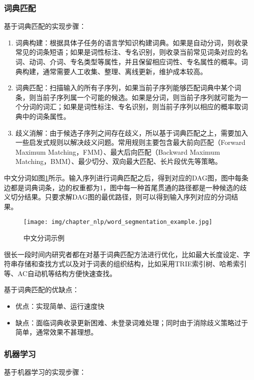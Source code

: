 \subsubsection{词典匹配}
\noindent
基于词典匹配的实现步骤：

\begin{enumerate}
\item 词典构建：根据具体子任务的语言学知识构建词典。如果是自动分词，则收录常见的词条短语；如果是词性标注、专名识别，则收录当前常见词条对应的名词、动词、介词、专名类型等属性，并且保留相应词性、专名属性的概率。词典构建，通常需要人工收集、整理、离线更新，维护成本较高。
\item 词典匹配：扫描输入的所有子序列，如果当前子序列能够匹配词典中某个词条，则当前子序列属一个可能的候选。如果是分词，则当前子序列就可能为一个分词的词汇；如果是词性标注、专名识别，则当前子序列以相应的概率取词典中的词条属性。
\item 歧义消解：由于候选子序列之间存在歧义，所以基于词典匹配之上，需要加入一些启发式规则以解决歧义问题。常用规则主要包含最大前向匹配（Forward Maximum Matching，FMM）、最大后向匹配（Backward Maximum Matching，BMM）、最少切分、双向最大匹配、长片段优先等策略\cite{wong1996chinese}\cite{weichun2013research}。
\end{enumerate}

中文分词如图\ref{fig:word_segmentation_example}所示。输入序列进行词典匹配之后，得到对应的DAG图，图中每条边都是词典词条，边的权重都为1，图中每一种首尾贯通的路径都是一种候选的歧义切分结果。只要求解DAG图的最优路径，则可以得到输入序列对应的分词结果。

\begin{figure}[h!]
\centering
\texttt{[image: img/chapter\_nlp/word\_segmentation\_example.jpg]}
\caption{中文分词示例}
\label{fig:word_segmentation_example}
\end{figure}

很长一段时间内研究者都在对基于词典匹配方法进行优化，比如最大长度设定、字符串存储和查找方式以及对于词表的组织结构，比如采用TRIE索引树\cite{yang2012enhanced}、哈希索引\cite{li2003new}等、AC自动机\cite{ngword}等结构方便快速查找。

基于词典匹配的优缺点：
\begin{itemize}
\item 优点：实现简单、运行速度快
\item 缺点：面临词典收录更新困难、未登录词难处理；同时由于消除歧义策略过于简单，通常效果不甚理想。
\end{itemize}

\subsubsection{机器学习}
\noindent
基于机器学习的实现步骤：

